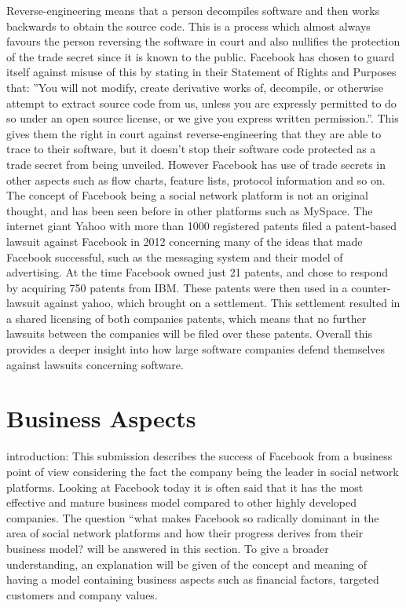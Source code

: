 \documentclass[conference]{IEEEtran}
\begin{document}
Reverse-engineering means that a person decompiles software and then works
backwards to obtain the source code. This is a process which almost always
favours the person reversing the software in court and also nullifies the
protection of the trade secret since it is known to the public. Facebook has
chosen to guard itself against misuse of this by stating in their Statement of
Rights and Purposes that: ”You will not modify, create derivative works of,
decompile, or otherwise attempt to extract source code from us, unless you are
expressly permitted to do so under an open source license, or we give you
express written permission.”. This gives them the right in court against
reverse-engineering that they are able to trace to their software, but it
doesn’t stop their software code protected as a trade secret from being
unveiled. However Facebook has use of trade secrets in other aspects such as
flow charts, feature lists, protocol information and so on.  The concept of
Facebook being a social network platform is not an original thought, and has
been seen before in other platforms such as MySpace. The internet giant Yahoo
with more than 1000 registered patents filed a patent-based lawsuit against
Facebook in 2012  concerning many of the ideas that made Facebook successful,
such as the messaging system and their model of advertising. At the time
Facebook owned just 21 patents, and chose to respond by acquiring 750 patents
from IBM. These patents were then used in a counter-lawsuit against yahoo,
which brought on a settlement. This settlement resulted in a shared licensing
of both companies patents, which means that no further lawsuits between the
companies will be filed over these patents. Overall this provides a deeper
insight into how large software companies defend themselves against lawsuits
concerning software.

\section{Business Aspects}
\label{financial}

introduction:
This submission describes the success of Facebook from a business point of view
considering the fact the company being the leader in social network platforms.
Looking at Facebook today it is often said that it has the most effective and
mature business model compared to other highly developed companies. The
question “what makes Facebook so radically dominant in the area of social
network platforms and how their progress derives from their business model?
will be answered in this section. To give a broader understanding, an
explanation will be given of the concept and meaning of having a model
containing business aspects such as financial factors, targeted customers and
company values.
\end{document}
